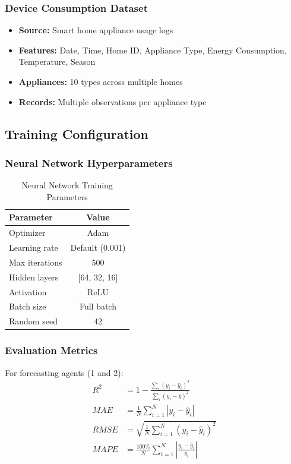 \documentclass[conference]{IEEEtran}
\begin{document}
\subsubsection{Device Consumption Dataset}
\begin{itemize}
    \item \textbf{Source:} Smart home appliance usage logs
    \item \textbf{Features:} Date, Time, Home ID, Appliance Type, Energy Consumption, Temperature, Season
    \item \textbf{Appliances:} 10 types across multiple homes
    \item \textbf{Records:} Multiple observations per appliance type
\end{itemize}

\subsection{Training Configuration}

\subsubsection{Neural Network Hyperparameters}
\begin{table}[h]
\centering
\caption{Neural Network Training Parameters}
\begin{tabular}{@{}lc@{}}
\toprule
\textbf{Parameter} & \textbf{Value} \\
\midrule
Optimizer & Adam \\
Learning rate & Default (0.001) \\
Max iterations & 500 \\
Hidden layers & [64, 32, 16] \\
Activation & ReLU \\
Batch size & Full batch \\
Random seed & 42 \\
\bottomrule
\end{tabular}
\end{table}

\subsubsection{Evaluation Metrics}
For forecasting agents (1 and 2):
\begin{align}
R^2 &= 1 - \frac{\sum_i (y_i - \hat{y}_i)^2}{\sum_i (y_i - \bar{y})^2} \\
MAE &= \frac{1}{N}\sum_{i=1}^N |y_i - \hat{y}_i| \\
RMSE &= \sqrt{\frac{1}{N}\sum_{i=1}^N (y_i - \hat{y}_i)^2} \\
MAPE &= \frac{100\%}{N}\sum_{i=1}^N \left|\frac{y_i - \hat{y}_i}{y_i}\right|
\end{align}
\end{document}
